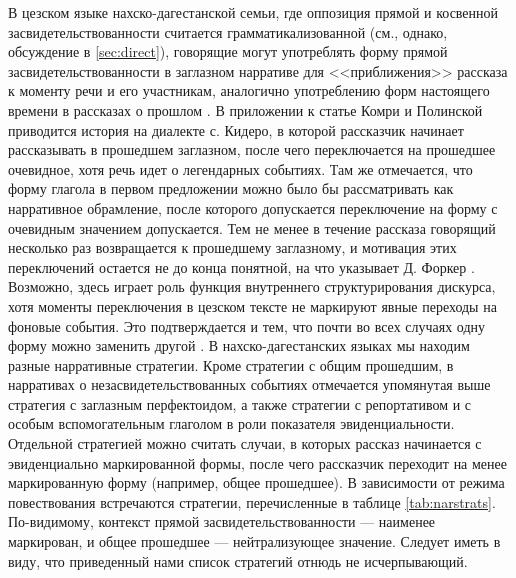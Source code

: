 \par В цезском языке нахско-дагестанской семьи, где оппозиция прямой и косвенной засвидетельствованности считается грамматикализованной (см., однако, обсуждение в \ref{sec:direct}), говорящие могут употреблять форму прямой засвидетельствованности в заглазном нарративе для <<приближения>> рассказа к моменту речи и его участникам, аналогично употреблению форм настоящего времени в рассказах о прошлом \citep{comriepolinsky2007}. В приложении к статье Комри и Полинской приводится история на диалекте с. Кидеро, в которой рассказчик начинает рассказывать в прошедшем заглазном, после чего переключается на прошедшее очевидное, хотя речь идет о легендарных событиях. Там же отмечается, что форму глагола в первом предложении можно было бы рассматривать как нарративное обрамление, после которого допускается переключение на форму с очевидным значением допускается. Тем не менее в течение рассказа говорящий несколько раз возвращается к прошедшему заглазному, и мотивация этих переключений остается не до конца понятной, на что указывает Д. Форкер \citep[499]{forker2018evid}. Возможно, здесь играет роль функция внутреннего структурирования дискурса, хотя моменты переключения в цезском тексте не маркируют явные переходы на фоновые события. Это подтверждается и тем, что почти во всех случаях одну форму можно заменить другой \citep[342--343]{comriepolinsky2007}. В нахско-дагестанских языках мы находим разные нарративные стратегии. Кроме стратегии с общим прошедшим, в нарративах о незасвидетельствованных событиях отмечается упомянутая выше стратегия с заглазным перфектоидом, а также стратегии с репортативом и с особым вспомогательным глаголом в роли показателя эвиденциальности. Отдельной стратегией можно считать случаи, в которых рассказ начинается с эвиденциально маркированной формы, после чего рассказчик переходит на менее маркированную форму (например, общее прошедшее). В зависимости от режима повествования встречаются стратегии, перечисленные в таблице \ref{tab:narstrats}. По-видимому, контекст прямой засвидетельствованности --- наименее маркирован, и общее прошедшее --- нейтрализующее значение.
Следует иметь в виду, что приведенный нами список стратегий отнюдь не исчерпывающий.

